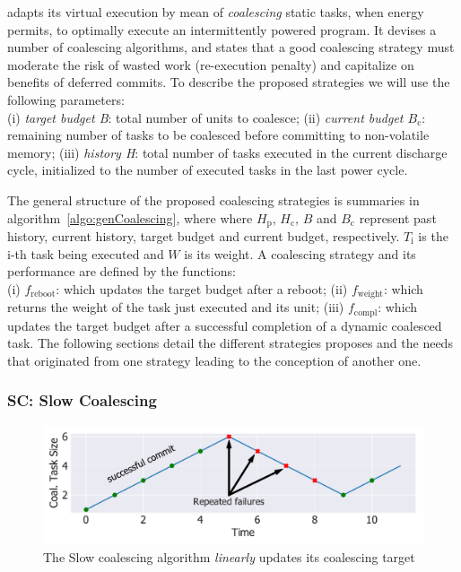 \sys adapts its virtual execution by mean of \emph{coalescing} static tasks, when energy permits, to optimally execute an intermittently powered program. It devises a number of coalescing algorithms, and states that a good coalescing strategy must moderate the risk of wasted work (re-execution penalty) and capitalize on benefits of deferred commits. To describe the proposed strategies we will use the following parameters: \\
(i) \textit{target budget B}: total number of units to coalesce; (ii) \textit{current budget $B_\text{c}$}: remaining number of tasks to be coalesced before committing to non-volatile memory; (iii) \textit{history H}: total number of tasks executed in the current discharge cycle, initialized to the number of executed tasks in the last power cycle. 

The general structure of the proposed coalescing strategies is summaries in algorithm~\ref{algo:genCoalescing}, where where $H_\text{p}$, $H_\text{c}$, $B$ and $B_\text{c}$ represent past history, current history, target budget and current budget, respectively. $T_\text{i}$ is the i-th task being executed and $W$ is its weight.
A coalescing strategy and its performance are defined by the functions: \\
(i) \emph{$f_\text{reboot}$}: which updates the target budget after a reboot; (ii) \emph{$f_\text{weight}$}: which returns the weight of the task just executed and its unit; (iii) \emph{$f_\text{compl}$}: which updates the target budget after a successful completion of a dynamic coalesced task. The following sections detail the different strategies \sys proposes and the needs that originated from one strategy leading to the conception of another one.

\subsubsection{SC: Slow Coalescing}
\label{subsec:slowCoalescing}

\begin{figure}
	\centering
	\includegraphics[width=\columnwidth]{figures/slowCoal}%
	\caption{The Slow coalescing algorithm \emph{linearly} updates its coalescing target}
	\label{fig:slowCoal}
\end{figure}

